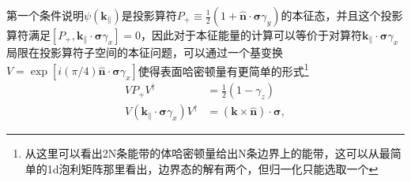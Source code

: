 \documentclass[10pt,openany]{book}
\theoremstyle{thmstyle} %
\theoremstyle{defstyle} %
\theoremstyle{prostyle} %
\begin{document}
第一个条件说明$ \psi\left(\boldsymbol{k}_{\|}\right) $是投影算符$ P_{+} \equiv \frac{1}{2}\left(1+\hat{\boldsymbol{n}} \cdot \boldsymbol{\sigma} \gamma_y\right) $的本征态，并且这个投影算符满足$ \left[P_{+}, \boldsymbol{k}_{\|} \cdot \boldsymbol{\sigma} \gamma_x\right]=0 $，因此对于本征能量的计算可以等价于对算符$ \boldsymbol{k}_{\|} \cdot \boldsymbol{\sigma} \gamma_x $局限在投影算符子空间的本征问题，可以通过一个基变换$ V=\exp \left[i(\pi / 4) \hat{\boldsymbol{n}} \cdot \boldsymbol{\sigma} \gamma_x\right] $使得表面哈密顿量有更简单的形式\footnote{从这里可以看出2N条能带的体哈密顿量给出N条边界上的能带，这可以从最简单的1d泡利矩阵那里看出，边界态的解有两个，但归一化只能选取一个}
\begin{equation}
  \begin{aligned}
    V P_{+} V^{\dagger} & =\frac{1}{2}\left(1-\gamma_z\right) \\
    V\left(\boldsymbol{k}_{\|} \cdot \boldsymbol{\sigma} \gamma_x\right) V^{\dagger} & =(\boldsymbol{k} \times \hat{\boldsymbol{n}}) \cdot \boldsymbol{\sigma},
    \end{aligned}
\end{equation}      
\end{document}
